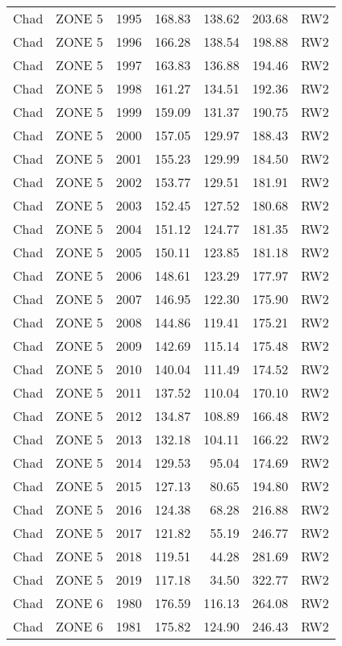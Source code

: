 \begin{longtable}{lllrrrl}
  Chad & ZONE 5 & 1995 & 168.83 & 138.62 & 203.68 & RW2 \\ 
  Chad & ZONE 5 & 1996 & 166.28 & 138.54 & 198.88 & RW2 \\ 
  Chad & ZONE 5 & 1997 & 163.83 & 136.88 & 194.46 & RW2 \\ 
  Chad & ZONE 5 & 1998 & 161.27 & 134.51 & 192.36 & RW2 \\ 
  Chad & ZONE 5 & 1999 & 159.09 & 131.37 & 190.75 & RW2 \\ 
  Chad & ZONE 5 & 2000 & 157.05 & 129.97 & 188.43 & RW2 \\ 
  Chad & ZONE 5 & 2001 & 155.23 & 129.99 & 184.50 & RW2 \\ 
  Chad & ZONE 5 & 2002 & 153.77 & 129.51 & 181.91 & RW2 \\ 
  Chad & ZONE 5 & 2003 & 152.45 & 127.52 & 180.68 & RW2 \\ 
  Chad & ZONE 5 & 2004 & 151.12 & 124.77 & 181.35 & RW2 \\ 
  Chad & ZONE 5 & 2005 & 150.11 & 123.85 & 181.18 & RW2 \\ 
  Chad & ZONE 5 & 2006 & 148.61 & 123.29 & 177.97 & RW2 \\ 
  Chad & ZONE 5 & 2007 & 146.95 & 122.30 & 175.90 & RW2 \\ 
  Chad & ZONE 5 & 2008 & 144.86 & 119.41 & 175.21 & RW2 \\ 
  Chad & ZONE 5 & 2009 & 142.69 & 115.14 & 175.48 & RW2 \\ 
  Chad & ZONE 5 & 2010 & 140.04 & 111.49 & 174.52 & RW2 \\ 
  Chad & ZONE 5 & 2011 & 137.52 & 110.04 & 170.10 & RW2 \\ 
  Chad & ZONE 5 & 2012 & 134.87 & 108.89 & 166.48 & RW2 \\ 
  Chad & ZONE 5 & 2013 & 132.18 & 104.11 & 166.22 & RW2 \\ 
  Chad & ZONE 5 & 2014 & 129.53 & 95.04 & 174.69 & RW2 \\ 
  Chad & ZONE 5 & 2015 & 127.13 & 80.65 & 194.80 & RW2 \\ 
  Chad & ZONE 5 & 2016 & 124.38 & 68.28 & 216.88 & RW2 \\ 
  Chad & ZONE 5 & 2017 & 121.82 & 55.19 & 246.77 & RW2 \\ 
  Chad & ZONE 5 & 2018 & 119.51 & 44.28 & 281.69 & RW2 \\ 
  Chad & ZONE 5 & 2019 & 117.18 & 34.50 & 322.77 & RW2 \\ 
  Chad & ZONE 6 & 1980 & 176.59 & 116.13 & 264.08 & RW2 \\ 
  Chad & ZONE 6 & 1981 & 175.82 & 124.90 & 246.43 & RW2 \\ 

\end{longtable}
